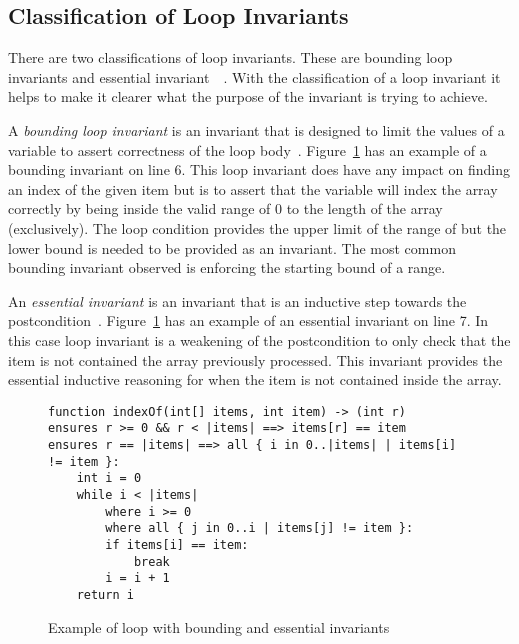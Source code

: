 \subsection{Classification of Loop Invariants}

There are two classifications of loop invariants.
These are bounding loop invariants and essential invariant~\cite{invarints-classifiction}~\cite{loop-inv-survey}.
With the classification of a loop invariant it helps to make
it clearer what the purpose of the invariant is trying to achieve.

A \textit{bounding loop invariant} is an invariant that is designed
to limit the values of a variable to assert correctness of the loop
body~\cite{loop-inv-survey}.
Figure~\ref{lst:whiley-inv-class} has an example of a bounding invariant on
line 6. This loop invariant does have any impact on finding an index
of the given item but is to assert that the variable  will index
the array correctly by being inside the valid range of 0 to the length of
the array (exclusively).
The loop condition provides the upper limit of the range of  but
the lower bound is needed to be provided as an invariant.
The most common bounding invariant observed is enforcing the starting bound
of a range.

An \textit{essential invariant} is an invariant that is an inductive step towards the
postcondition\cite{invarints-classifiction}~\cite{loop-inv-survey}.
Figure~\ref{lst:whiley-inv-class} has an example of an essential invariant on
line 7.
In this case loop invariant is a weakening of the postcondition to only
check that the item is not contained the array previously processed.
This invariant provides the essential inductive reasoning for when the item is
not contained inside the array.

\begin{figure}[ht]
\begin{lstlisting}
function indexOf(int[] items, int item) -> (int r)
ensures r >= 0 && r < |items| ==> items[r] == item
ensures r == |items| ==> all { i in 0..|items| | items[i] != item }:
    int i = 0
    while i < |items|
        where i >= 0
        where all { j in 0..i | items[j] != item }:
        if items[i] == item:
            break
        i = i + 1
    return i
\end{lstlisting}
\caption{Example of loop with bounding and essential invariants}
\label{lst:whiley-inv-class}
\end{figure}


